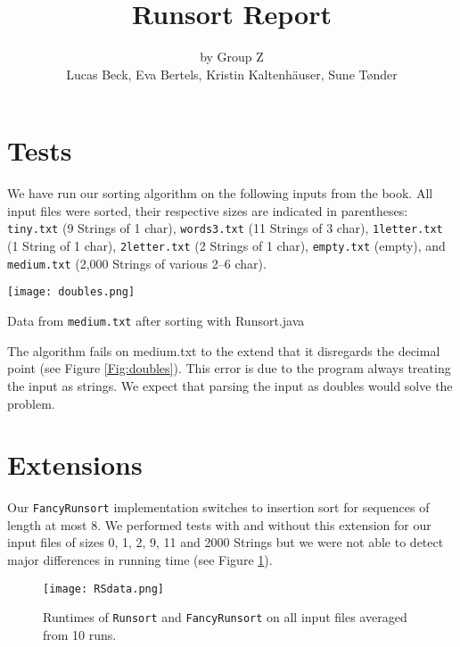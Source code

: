 \documentclass{tufte-handout}
\title{Runsort Report}
\author{by Group Z\\ Lucas Beck, Eva Bertels, Kristin Kaltenh\"{a}user, Sune T\o nder}
\begin{document}
\maketitle

\section{Tests}

  We have run our sorting algorithm on the following inputs from the book. All input files were sorted, their respective sizes are indicated in parentheses:
    {\tt tiny.txt} (9 Strings of 1 char), {\tt words3.txt} (11 Strings of 3 char), {\tt 1letter.txt} (1 String of 1 char), {\tt 2letter.txt} (2 Strings of 1 char), {\tt empty.txt} (empty), and {\tt medium.txt} (2,000 Strings of various 2--6 char).
    
  \begin{marginfigure}
  \texttt{[image: doubles.png]}
  \caption{Data from {\tt medium.txt} after sorting with Runsort.java}
  \label{Fig:doubles}
  \end{marginfigure}

  The algorithm fails on medium.txt to the extend that it disregards the decimal point (see Figure \ref{Fig:doubles}). This error is due to the program always treating the input as strings. We expect that parsing the input as doubles would solve the problem.

  \section{Extensions}  

  Our {\tt FancyRunsort} implementation switches to insertion sort for sequences of length at most 8.
  We performed tests with and without this extension for our input files of sizes 0, 1, 2, 9, 11 and 2000 Strings but
  we were not able to detect major differences in running time (see Figure \ref{Fig:plot}).
  
  \begin{figure}
  \texttt{[image: RSdata.png]}
  \caption{Runtimes of {\tt Runsort} and {\tt FancyRunsort} on all input files averaged from 10 runs.}
  \label{Fig:plot}
  \end{figure}
\end{document}
